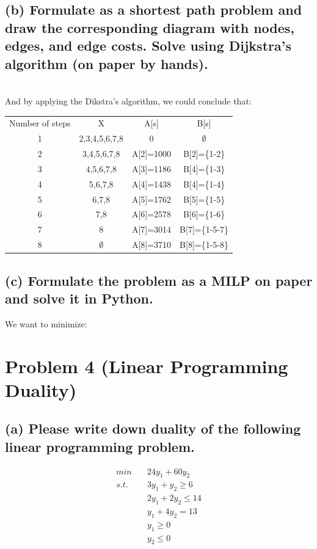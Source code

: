 \documentclass[a4paper,12pt]{journal}
\begin{document}
	\subsection*{(b) Formulate as a shortest path problem and draw the corresponding diagram with nodes, edges, and edge costs. Solve using Dijkstra’s algorithm (on paper by hands).}
	\\
	And by applying the Dikstra's algorithm, we could conclude that:
	\begin{center}
		\begin{tabular}{c c c c}
			Number of steps&X&A[s]&B[s]\\
			1&2,3,4,5,6,7,8&0&$\emptyset$\\
			2&3,4,5,6,7,8&A[2]=1000&B[2]=\{1-2\}\\
			3&4,5,6,7,8&A[3]=1186&B[4]=\{1-3\}\\
			4&5,6,7,8&A[4]=1438&B[4]=\{1-4\}\\
			5&6,7,8&A[5]=1762&B[5]=\{1-5\}\\
			6&7,8&A[6]=2578&B[6]=\{1-6\}\\
			7&8&A[7]=3014&B[7]=\{1-5-7\}\\
			8&$\emptyset$&A[8]=3710&B[8]=\{1-5-8\}\\
		\end{tabular}
	\end{center}
	\subsection*{(c) Formulate the problem as a MILP on paper and solve it in Python.}
	We want to minimize: 
	\section*{Problem 4 (Linear Programming Duality)}
	\subsection*{(a) Please write down duality of the following linear programming problem.}
	\begin{equation}
		\begin{aligned}
			min\quad&24y_1+60y_2\\
			s.t.\quad&3y_1+y_2\geq 6\\
			&2y_1+2y_2\leq 14\\
			&y_1+4y_2= 13\\
			&y_1\geq 0\\
			&y_2\leq 0\\
		\end{aligned}
	\end{equation}
\end{document}
